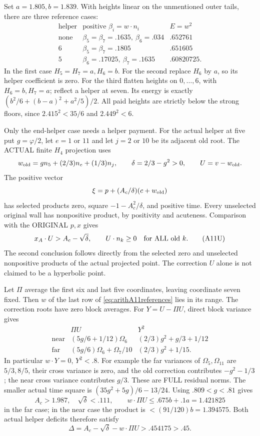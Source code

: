 \documentclass[11pt]{article}
\begin{document}
Set \(a=1.805,b=1.839\).
With heights linear on the unmentioned
outer tails, there are three reference cases:
\[
 \begin{array}{c|c|c}
 \text{helper}&\text{positive }\beta_i=w\cdot n_i
                      &E=w^2\\ \hline
 \text{none}&\beta_5=\beta_7=.1635,\ \beta_6=.034&.652761\\
 6&\beta_5=\beta_7=.1805&.651605\\
 5&\beta_6=.17025,\ \beta_7=.1635&.60820725 .
 \end{array}
\tag{A11refs}\label{eq:arithA11references}
\]
In the first case \(H_5=H_7=a,H_6=b\).
For the second replace \(H_6\) by \(a\),
so its helper coefficient is zero.
For the third flatten heights on \(0,\ldots,6\),
with \(H_6=b,H_7=a\); reflect a helper at seven.
Its energy is exactly
\((b^2/6+(b-a)^2+a^2/5)/2\).
All paid heights are strictly below the strong
floors, since \(2.415^2<35/6\) and \(2.449^2<6\).

Only the end-helper case needs a helper payment.
For the actual helper at five put \(g=\varphi/2\),
let \(e=1\) or \(11\) and let \(j=2\) or \(10\)
be its adjacent old root.
The ACTUAL finite \(H_4\) projection uses
\[
 w_{\rm old}=gn_5+(2/3)n_e+(1/3)n_j,\qquad
 \delta=2/3-g^2>0,\qquad U=v-w_{\rm old}.
\]
The positive vector
\[
       \xi=p+(A_c/\delta)(c+w_{\rm old})
\]
has selected products zero, square
\(-1-A_c^2/\delta\), and positive time.
Every unselected original wall has nonpositive
product, by positivity and acuteness.
Comparison with the ORIGINAL \(p,x\) gives
\[
 x_A\cdot U>A_c-\sqrt\delta,\qquad
             U\cdot n_k\ge0\quad\hbox{for ALL old }k .
\tag{A11U}\label{eq:arithA11helperpressure}
\]
The second conclusion follows directly from
the selected zero and unselected nonpositive
products of the actual projected point.
The correction \(U\) alone is not claimed
to be a hyperbolic point.

Let \(\Pi\) average the first six and last five
coordinates, leaving coordinate seven fixed.
Then \(w\) of the last row of
\eqref{eq:arithA11references} lies in its range.
The correction roots have zero block averages.
For \(Y=U-\Pi U\), direct block variance gives
\[
 \begin{array}{c|c|c}
 &\Pi U&Y^2\\ \hline
 \text{near}&(5g/6+1/12)\Omega_6&
           (2/3)g^2+g/3+1/12\\
 \text{far}&(5g/6)\Omega_6+\Omega_7/10&
           (2/3)g^2+1/15 .
 \end{array}
\]
In particular \(w\cdot Y=0\), \(Y^2<.8\).
For example the far variances of
\(\Omega_5,\Omega_{11}\) are \(5/3,8/5\),
their cross variance is zero, and the old
correction contributes \(-g^2-1/3\);
the near cross variance contributes \(g/3\).
These are FULL residual norms.
The smaller actual time square is
\((35g^2+5g)/6-13/24\).
Using \(.809<g<.81\) gives
\[
 A_c>1.987,\quad\sqrt\delta<.111,\qquad
 w\cdot\Pi U\le.675b+.1a=1.421825
\]
in the far case; in the near case the product
is \(<(91/120)b=1.394575\).
Both actual helper deficits therefore satisfy
\[
 \Delta=A_c-\sqrt\delta-w\cdot\Pi U
                         >.454175>.45 .
\]
\end{document}
